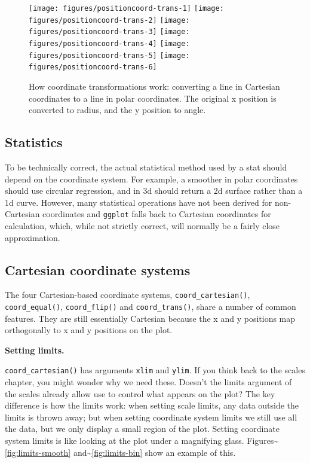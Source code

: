 \begin{figure}

{\centering \texttt{[image: figures/positioncoord-trans-1]} \texttt{[image: figures/positioncoord-trans-2]} \texttt{[image: figures/positioncoord-trans-3]} \texttt{[image: figures/positioncoord-trans-4]} \texttt{[image: figures/positioncoord-trans-5]} \texttt{[image: figures/positioncoord-trans-6]} 

}

\caption{How coordinate transformations work: converting a line in Cartesian coordinates to a line in polar coordinates.  The original x position is converted to radius, and the y position to angle.\label{fig:coord-trans}}
\end{figure}

\subsection{Statistics}\label{sub:statistics}

To be technically correct, the actual statistical method used by a stat
should depend on the coordinate system. For example, a smoother in polar
coordinates should use circular regression, and in 3d should return a 2d
surface rather than a 1d curve. However, many statistical operations
have not been derived for non-Cartesian coordinates and \texttt{ggplot}
falls back to Cartesian coordinates for calculation, which, while not
strictly correct, will normally be a fairly close approximation.

\subsection{Cartesian coordinate systems}\label{sub:cartesian}

The four Cartesian-based coordinate systems,
\texttt{coord\_cartesian()}, \texttt{coord\_equal()},
\texttt{coord\_flip()} and \texttt{coord\_trans()}, share a number of
common features. They are still essentially Cartesian because the x and
y positions map orthogonally to x and y positions on the plot.
 

\textbf{Setting limits.}

\texttt{coord\_cartesian()} has arguments \texttt{xlim} and
\texttt{ylim}. If you think back to the scales chapter, you might wonder
why we need these. Doesn't the limits argument of the scales already
allow use to control what appears on the plot? The key difference is how
the limits work: when setting scale limits, any data outside the limits
is thrown away; but when setting coordinate system limits we still use
all the data, but we only display a small region of the plot. Setting
coordinate system limits is like looking at the plot under a magnifying
glass. Figures\textasciitilde{}\ref{fig:limits-smooth}
and\textasciitilde{}\ref{fig:limits-bin} show an example of this.
 

